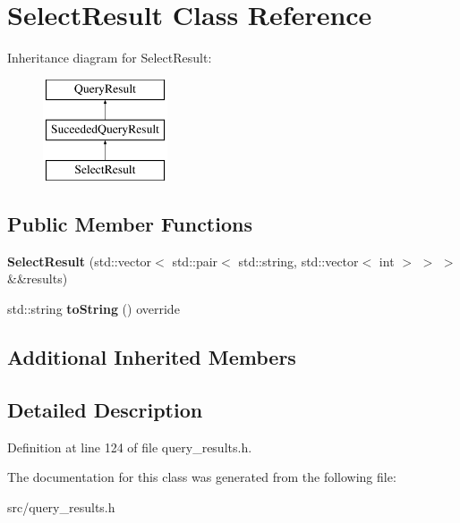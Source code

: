 \hypertarget{class_select_result}{}\section{Select\+Result Class Reference}
\label{class_select_result}
Inheritance diagram for Select\+Result\+:\begin{figure}[H]
\begin{center}
\leavevmode
\includegraphics[height=3.000000cm]{class_select_result}
\end{center}
\end{figure}
\subsection*{Public Member Functions}
\begin{DoxyCompactItemize}
\item 
\mbox{\label{class_select_result_ac706b6a0c2da988c249eaaff635313d4}} 
{\bfseries Select\+Result} (std\+::vector$<$ std\+::pair$<$ std\+::string, std\+::vector$<$ int $>$ $>$ $>$ \&\&results)
\item 
\mbox{\label{class_select_result_a797ee6d6678401b69ed87d850af06a20}} 
std\+::string {\bfseries to\+String} () override
\end{DoxyCompactItemize}
\subsection*{Additional Inherited Members}


\subsection{Detailed Description}


Definition at line 124 of file query\+\_\+results.\+h.



The documentation for this class was generated from the following file\+:\begin{DoxyCompactItemize}
\item 
src/query\+\_\+results.\+h\end{DoxyCompactItemize}
